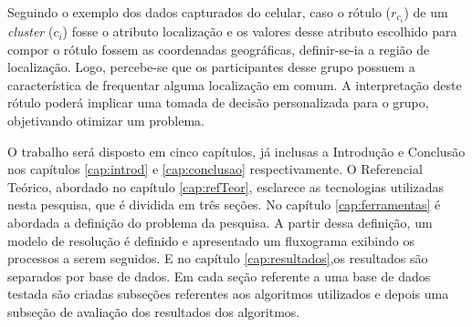 Seguindo o exemplo dos dados capturados do celular, caso o rótulo (${r_{c_i}}$) de um \textit{cluster} (${c_i}$) fosse o atributo localização e os valores desse atributo escolhido para compor o rótulo fossem as coordenadas geográficas, definir-se-ia a região de localização. Logo, percebe-se que os participantes desse grupo possuem a característica de frequentar alguma localização em comum. A interpretação deste rótulo poderá implicar uma tomada de decisão personalizada para o grupo, objetivando otimizar um problema. 

 



O trabalho será disposto em cinco capítulos, já inclusas a Introdução e Conclusão nos capítulos \ref{cap:introd} e \ref{cap:conclusao} respectivamente. O Referencial Teórico, abordado no capítulo \ref{cap:refTeor}, esclarece as tecnologias utilizadas nesta pesquisa, que é dividida em três seções. No capítulo \ref{cap:ferramentas} é abordada a definição do problema da pesquisa. A partir dessa definição, um modelo de resolução é definido e apresentado um fluxograma exibindo os processos a serem seguidos. E  no capítulo \ref{cap:resultados},os resultados são separados por base de dados. Em cada seção referente a uma base de dados testada são criadas subseções referentes aos algoritmos utilizados  e depois uma subseção de avaliação dos resultados dos algoritmos.

